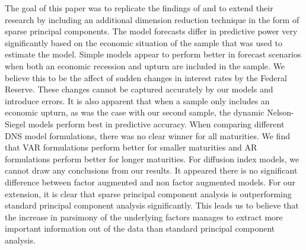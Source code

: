 The goal of this paper was to replicate the findings of \textcite{swanson_big_2017} and to extend their research by including an additional dimension reduction technique in the form of sparse principal components. 
The model forecasts differ in predictive power very significantly based on the economic situation of the sample that was used to estimate the model. 
Simple models appear to perform better in forecast scenarios when both an economic recession and upturn are included in the sample.
We believe this to be the affect of sudden changes in interest rates by the Federal Reserve.
These changes cannot be captured accurately by our models and introduce errors.
It is also apparent that when a sample only includes an economic upturn, as was the case with our second sample, the dynamic Nelson-Siegel models perform best in predictive accuracy. 
When comparing different DNS model formulations, there was no clear winner for all maturities. 
We find that VAR formulations perform better for smaller maturities and AR formulations perform better for longer maturities. 
For diffusion index models, we cannot draw any conclusions from our results. 
It appeared there is no significant difference between factor augmented and non factor augmented models. 
For our extension, it is clear that sparse principal component analysis is outperforming standard principal component analysis significantly.
This leads us to believe that the increase in parsimony of the underlying factors manages to extract more important information out of the data than standard principal component analysis.